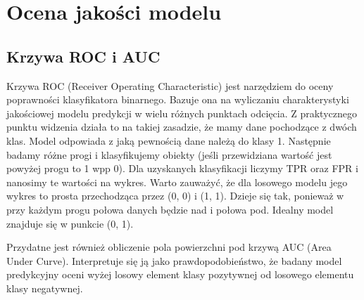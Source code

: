 \section{Ocena jakości modelu}

\subsection{Krzywa ROC i AUC}

Krzywa ROC (Receiver Operating Characteristic) jest narzędziem do oceny poprawności klasyfikatora binarnego. Bazuje ona na wyliczaniu charakterystyki jakościowej modelu predykcji w wielu różnych punktach odcięcia. Z praktycznego punktu widzenia działa to na takiej zasadzie, że mamy dane pochodzące z dwóch klas. Model odpowiada z jaką pewnością dane należą do klasy 1. Następnie badamy różne progi i klasyfikujemy obiekty (jeśli przewidziana wartość jest powyżej progu to 1 wpp 0). Dla uzyskanych klasyfikacji liczymy TPR oraz FPR i nanosimy te wartości na wykres. Warto zauważyć, że dla losowego modelu jego wykres to prosta przechodząca przez (0, 0) i (1, 1). Dzieje się tak, ponieważ w przy każdym progu połowa danych będzie nad i połowa pod. Idealny model znajduje się w punkcie (0, 1).

Przydatne jest również obliczenie pola powierzchni pod krzywą AUC (Area Under Curve). Interpretuje się ją jako prawdopodobieństwo, że badany model predykcyjny oceni wyżej losowy element klasy pozytywnej od losowego elementu klasy negatywnej.

